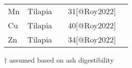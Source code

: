 \begin{table}
\begin{threeparttable}
\begin{tabularx}{\textwidth}{Xlccc}
    \addlinespace
    
    Mn
    & Tilapia
    &
    & \SI{31}{\p}[@Roy2022]
    &
    \\
    
    \addlinespace
    
    Cu
    & Tilapia
    &
    & \SI{40}{\p}[@Roy2022]
    &
    \\
    
    \addlinespace
    
    Zn
    & Tilapia
    &
    & \SI{34}{\p}[@Roy2022]
    &
    \\
    
    \bottomrule

    \end{tabularx}
    \begin{tablenotes}
      \item[†] assumed based on ash digestibility
    \end{tablenotes}
  \end{threeparttable}
\end{table}
